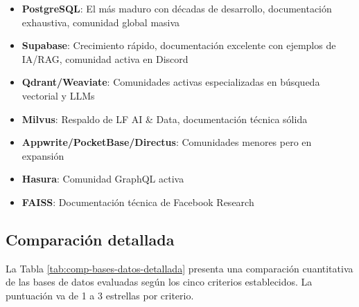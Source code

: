 \begin{itemize}
    \item \textbf{PostgreSQL}: El más maduro con décadas de desarrollo, documentación exhaustiva, comunidad global masiva
    \item \textbf{Supabase}: Crecimiento rápido, documentación excelente con ejemplos de IA/RAG, comunidad activa en Discord
    \item \textbf{Qdrant/Weaviate}: Comunidades activas especializadas en búsqueda vectorial y LLMs
    \item \textbf{Milvus}: Respaldo de LF AI \& Data, documentación técnica sólida
    \item \textbf{Appwrite/PocketBase/Directus}: Comunidades menores pero en expansión
    \item \textbf{Hasura}: Comunidad GraphQL activa
    \item \textbf{FAISS}: Documentación técnica de Facebook Research
\end{itemize}

\subsection{Comparación detallada}

La Tabla \ref{tab:comp-bases-datos-detallada} presenta una comparación cuantitativa de las bases de datos evaluadas según los cinco criterios establecidos. La puntuación va de 1 a 3 estrellas por criterio.

